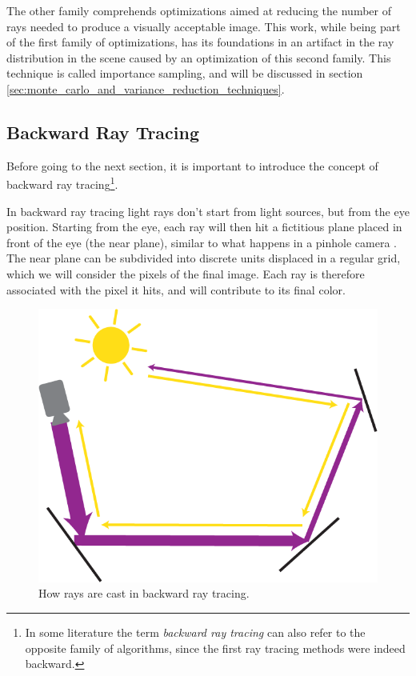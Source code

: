 \documentclass{PoliMi_MasterThesis}
\begin{document}
The other family comprehends optimizations aimed at reducing the number of rays needed to produce a visually acceptable image. This work, while being part of the first family of optimizations, has its foundations in an artifact in the ray distribution in the scene caused by an optimization of this second family. This technique is called importance sampling, and will be discussed in section \ref{sec:monte_carlo_and_variance_reduction_techniques}.

\subsection{Backward Ray Tracing}
Before going to the next section, it is important to introduce the concept of backward ray tracing\footnote{In some literature the term \textit{backward ray tracing} can also refer to the opposite family of algorithms, since the first ray tracing methods were indeed backward.}. 

In backward ray tracing light rays don't start from light sources, but from the eye position. Starting from the eye, each ray will then hit a fictitious plane placed in front of the eye (the near plane), similar to what happens in a pinhole camera \cite{pinhole_camera}. The near plane can be subdivided into discrete units displaced in a regular grid, which we will consider the pixels of the final image. Each ray is therefore associated with the pixel it hits, and will contribute to its final color.

\begin{figure}[H]
    \centering
    \includegraphics[width=\textwidth*\real{0.6}]{Images/backward_ray_tracing.png}
    \caption{How rays are cast in backward ray tracing.}
    \label{fig:pinhole_camera}
\end{figure}
\end{document}
